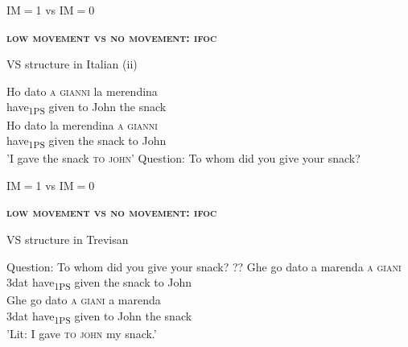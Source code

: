 \documentclass[lesson_slides]{subfiles}
\begin{document}
\begin{frame}[c]{IM$=$1 vs IM$=$0}

    \noindent \textbf{\textsc{low movement vs no movement: ifoc}}

    \begin{exe}
    \ex VS structure in Italian (ii) \pause
        \begin{xlist}
            \ex \gll * Ho dato \textsc{a} \textsc{gianni} la merendina\\
            {} have\textsubscript{1PS} given to John the snack\\  
            \ex \gll Ho dato la merendina \textsc{a} \textsc{gianni}\\
            have\textsubscript{1PS} given the snack to John\\
            \glt 'I gave the snack \textsc{to} \textsc{john}' \pause
            \ex Question: To whom did you give your snack?
        \end{xlist}
    \end{exe}

\end{frame}
\begin{frame}[c]{IM$=$1 vs IM$=$0}

    \noindent \textbf{\textsc{low movement vs no movement: ifoc}}

    \begin{exe}
        \ex VS structure in Trevisan \pause
            \begin{xlist}
                \ex Question: To whom did you give your snack? \pause
                \ex \gll ?? Ghe go dato a marenda \textsc{a} \textsc{giani}\\
                {} 3dat have\textsubscript{1PS} given the snack to John\\
                \ex \gll Ghe go dato \textsc{a} \textsc{giani} a marenda\\
                3dat have\textsubscript{1PS} given to John the snack\\
                \glt 'Lit: I gave \textsc{to} \textsc{john} my snack.'
            \end{xlist}
    \end{exe}

\end{frame}
\end{document}
